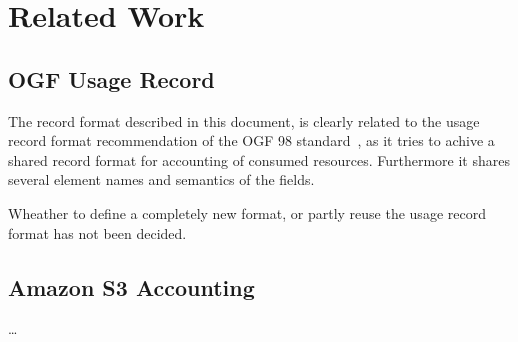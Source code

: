 \section{Related Work}


\subsection{OGF Usage Record}

The record format described in this document, is clearly related to the usage
record format recommendation of the OGF 98 standard~\cite{ogf98ur}, as it tries
to achive a shared record format for accounting of consumed resources.
Furthermore it shares several element names and semantics of the fields.

Wheather to define a completely new format, or partly reuse the usage record
format has not been decided.


\subsection{Amazon S3 Accounting}

\ldots

